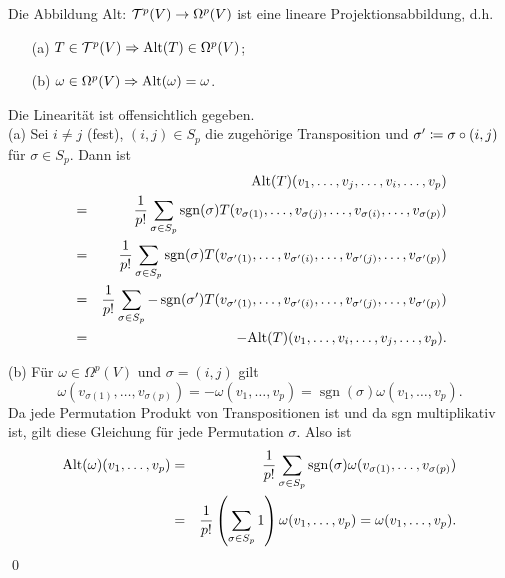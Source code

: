 \documentclass[a4paper,twoside,DIV15,BCOR12mm]{scrbook}
\DeclareMathOperator{\sgn}{sgn}
\begin{document}
\bigskip

\begin{satz}\label{Satz3.3.2} {Die Abbildung {\rm Alt}: ${\cal T}^{p}(V) 
\to \Omega^{p}(V)$ ist eine lineare Projektionsabbildung, d.h.}
\begin{enumerate}
\item[{\rm (a)}] $T \in {\cal T}^{p}(V) \Rightarrow {\rm Alt}(T) \in 
\Omega^{p}(V)$;
\item[{\rm (b)}] $\omega \in \Omega^{p}(V) \Rightarrow {\rm Alt}(\omega) = \omega$.
\end{enumerate}
\end{satz}

\bigskip

 Die Linearität ist offensichtlich gegeben.\\

\noindent
(a) Sei $i \not= j$ (fest), $(i,j) \in S_{p}$ die zugehörige 
Transposition und $\sigma' \da  \sigma \circ (i,j)$ für $\sigma \in 
S_{p}$. Dann ist
\begin{eqnarray*} 
&   & {\rm Alt}(T) (v_{1},\dots,v_{j},\dots,v_{i},\dots,v_{p}) \\
& = & \frac{1}{p!} \sum_{\sigma \in S_{p}} \sgn (\sigma) 
T(v_{\sigma(1)},\dots,v_{\sigma(j)},\dots,v_{\sigma(i)},\dots,v_{\sigma(p)}) \\
& = & \frac{1}{p!} \sum_{\sigma \in S_{p}} \sgn (\sigma) 
T(v_{\sigma'(1)},\dots,v_{\sigma'(i)},\dots,v_{\sigma'(j)},
\dots,v_{\sigma'(p)}) \\
& = & \frac{1}{p!} \sum_{\sigma \in S_{p}} - \sgn (\sigma') 
T(v_{\sigma'(1)},\dots,v_{\sigma'(i)},
\dots,v_{\sigma'(j)},\dots,v_{\sigma'(p)}) \\
& = & -{\rm Alt}(T)(v_{1},\dots,v_{i},\dots,v_{j},\dots,v_{p}).
\end{eqnarray*}

\noindent
(b) Für $\omega \in \Omega^{p}(V)$ und $\sigma = (i,j)$ gilt
\[ \omega(v_{\sigma(1)},\dots,v_{\sigma(p)}) = 
-\omega(v_{1},\dots,v_{p}) = \sgn (\sigma) 
\omega(v_{1},\dots,v_{p}). \]
Da jede Permutation Produkt von Transpositionen ist und da sgn 
multiplikativ ist, gilt diese Gleichung für jede Permutation 
$\sigma$. Also ist
\begin{eqnarray*}
{\rm Alt}(\omega)(v_{1},\dots,v_{p}) & = & \frac{1}{p!} \sum_{\sigma 
\in S_{p}} \sgn (\sigma) 
\omega(v_{\sigma(1)},\dots,v_{\sigma(p)}) \\
& = & \frac{1}{p!} \left(\sum_{\sigma \in S_{p}} 1\right) 
\omega(v_{1},\dots,v_{p}) = \omega(v_{1},\dots,v_{p}).
\end{eqnarray*}
\qed\\
\end{document}
